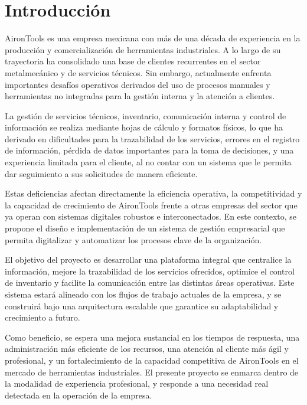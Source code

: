 \pagestyle{fancy}
\section{Introducción}

AironTools es una empresa mexicana con más de una década de experiencia en la producción y comercialización de herramientas industriales. A lo largo de su trayectoria ha consolidado una base de clientes recurrentes en el sector metalmecánico y de servicios técnicos. Sin embargo, actualmente enfrenta importantes desafíos operativos derivados del uso de procesos manuales y herramientas no integradas para la gestión interna y la atención a clientes.

La gestión de servicios técnicos, inventario, comunicación interna y control de información se realiza mediante hojas de cálculo y formatos físicos, lo que ha derivado en dificultades para la trazabilidad de los servicios, errores en el registro de información, pérdida de datos importantes para la toma de decisiones, y una experiencia limitada para el cliente, al no contar con un sistema que le permita dar seguimiento a sus solicitudes de manera eficiente.

Estas deficiencias afectan directamente la eficiencia operativa, la competitividad y la capacidad de crecimiento de AironTools frente a otras empresas del sector que ya operan con sistemas digitales robustos e interconectados. En este contexto, se propone el diseño e implementación de un sistema de gestión empresarial que permita digitalizar y automatizar los procesos clave de la organización.

El objetivo del proyecto es desarrollar una plataforma integral que centralice la información, mejore la trazabilidad de los servicios ofrecidos, optimice el control de inventario y facilite la comunicación entre las distintas áreas operativas. Este sistema estará alineado con los flujos de trabajo actuales de la empresa, y se construirá bajo una arquitectura escalable que garantice su adaptabilidad y crecimiento a futuro.

Como beneficio, se espera una mejora sustancial en los tiempos de respuesta, una administración más eficiente de los recursos, una atención al cliente más ágil y profesional, y un fortalecimiento de la capacidad competitiva de AironTools en el mercado de herramientas industriales. El presente proyecto se enmarca dentro de la modalidad de experiencia profesional, y responde a una necesidad real detectada en la operación de la empresa.

